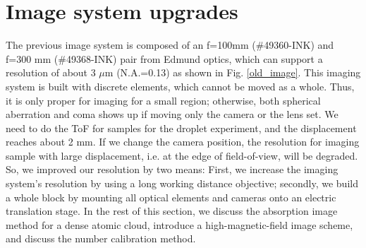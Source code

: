 \section{Image system upgrades}
\label{sec:image}

The previous image system is composed of an f=100mm (\#49360-INK) and f=300 mm (\#49368-INK) pair from Edmund optics, which can support a resolution of about 3 $\mu$m (N.A.=0.13) as shown in Fig. \ref{old_image}. This imaging system is built with discrete elements, which cannot be moved as a whole. Thus, it is only proper for imaging for a small region; otherwise, both spherical aberration and coma shows up if moving only the camera or the lens set. We need to do the ToF for samples for the droplet experiment, and the displacement reaches about 2 mm. If we change the camera position, the resolution for imaging sample with large displacement, i.e. at the edge of field-of-view, will be degraded. So, we improved our resolution by two means: First, we increase the imaging system's resolution by using a long working distance objective; secondly, we build a whole block by mounting all optical elements and cameras onto an electric translation stage. In the rest of this section, we discuss the absorption image method for a dense atomic cloud, introduce a high-magnetic-field image scheme, and discuss the number calibration method.


